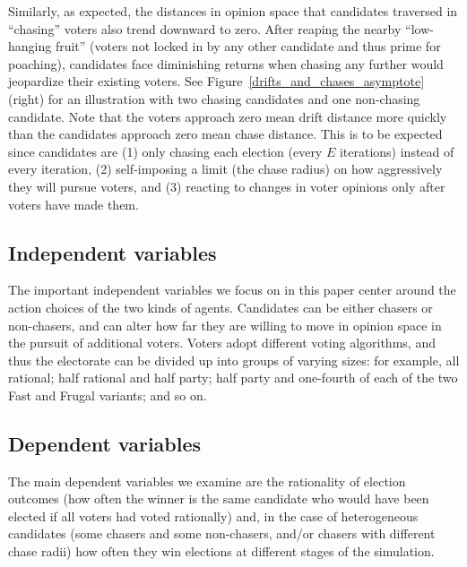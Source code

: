 Similarly, as expected, the distances in opinion space that candidates
traversed in ``chasing'' voters also trend downward to zero. After reaping the
nearby ``low-hanging fruit'' (voters not locked in by any other candidate and
thus prime for poaching), candidates face diminishing returns when chasing any
further would jeopardize their existing voters. See
Figure~\ref{drifts_and_chases_asymptote} (right) for an illustration with two
chasing candidates and one non-chasing candidate. Note that the voters approach zero mean drift distance more
quickly than the candidates approach zero mean chase distance. This is to be
expected since candidates are (1) only chasing each election (every $E$
iterations) instead of every iteration, (2) self-imposing a limit (the chase
radius) on how aggressively they will pursue voters, and (3) reacting to
changes in voter opinions only after voters have made them.


\subsection{Independent variables}

The important independent variables we focus on in this paper center around the
action choices of the two kinds of agents. Candidates can be either chasers or
non-chasers, and can alter how far they are willing to move in opinion space in
the pursuit of additional voters. Voters adopt different voting algorithms, and
thus the electorate can be divided up into groups of varying sizes: for
example, all rational; half rational and half party; half party and one-fourth
of each of the two Fast and Frugal variants; and so on.


\subsection{Dependent variables}

The main dependent variables we examine are the rationality of election
outcomes (how often the winner is the same candidate who would have been
elected if all voters had voted rationally) and, in the case of heterogeneous
candidates (some chasers and some non-chasers, and/or chasers with different
chase radii) how often they win elections at different stages of the
simulation.
